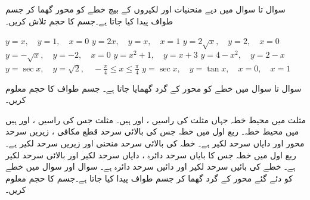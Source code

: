 سوال  تا سوال  میں دیے منحنیات اور لکیروں کے بیچ خطے کو  محور گھما کر جسم طواف پیدا کیا جاتا ہے۔جسم کا حجم تلاش کریں۔

$y=x,\quad y=1,\quad x=0$
$y=2x,\quad y=x,\quad x=1$
$y=2\sqrt{x},\quad y=2,\quad x=0$
$y=-\sqrt{x},\quad y=-2,\quad x=0$
$y=x^2+1,\quad y=x+3$
$y=4-x^2,\quad y=2-x$
$y=\sec x,\quad y=\sqrt{2},\quad -\tfrac{\pi}{4}\le x \le \tfrac{\pi}{4}$
$y=\sec x,\quad y=\tan x,\quad x=0,\quad x=1$

سوال  تا سوال  میں خطے کو  محور کے گرد گھمایا جاتا ہے۔ جسم طواف کا حجم معلوم کریں۔

مثلث میں محیط خطہ جہاں مثلث کی  راسیں ،  اور  ہیں۔ 
مثلث جس کی  راسیں ،  اور  ہیں میں محیط خطہ۔ 
ربع اول میں خطہ جس کی بالائی سرحد قطع مکافی ، زیریں سرحد محور  اور دایاں سرحد لکیر  ہے۔
خطہ کی بالائی سرحد منحنی  اور زیریں سرحد لکیر  ہے۔ 
ربع اول میں خطہ جس کا بایاں سرحد دائرہ ، دایاں سرحد لکیر  اور بالائی سرحد لکیر  ہے۔
خطے کی بائیں سرحد لکیر اور دائیں سرحد دائرہ  ہے۔
سوال  اور سوال  میں خطے کو دئے گئے محور کے گرد گھما کر جسم طواف پیدا کیا جاتا ہے۔جسم کا حجم معلوم کریں۔

